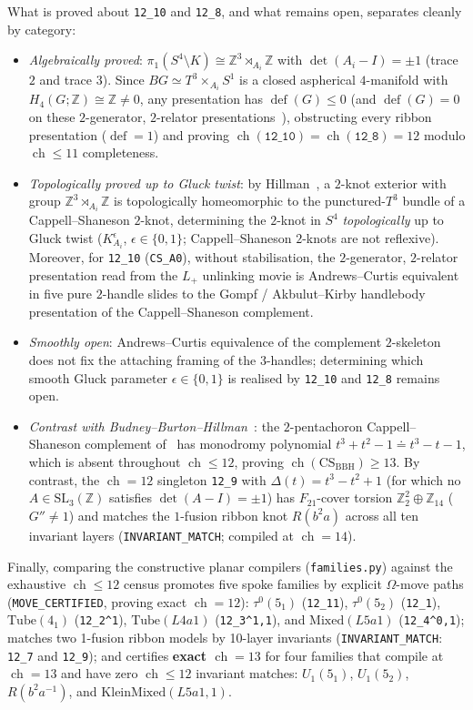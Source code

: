 \documentclass[11pt]{amsart}
\newcommand{\ch}{\operatorname{ch}}
\newcommand{\Z}{\mathbb{Z}}
\newcommand{\lab}[1]{\texttt{#1}}
\newcommand{\file}[1]{\texttt{#1}}
\newcommand{\inv}{^{-1}}
\theoremstyle{plain}
\theoremstyle{remark}
\begin{document}
What is proved about \lab{12\_10} and \lab{12\_8}, and what remains open, separates cleanly by category:
\begin{itemize}[leftmargin=*]
\item \emph{Algebraically proved}: $\pi_1(S^4\setminus K)\cong\Z^3\rtimes_{A_i}\Z$ with $\det(A_i-I)=\pm 1$
(trace $2$ and trace $3$). Since $BG\simeq T^3\times_{A_i}S^1$ is a closed aspherical $4$-manifold with
$H_4(G;\Z)\cong\Z\ne 0$, any presentation has $\operatorname{def}(G)\le 0$ (and $\operatorname{def}(G)=0$ on
these $2$-generator, $2$-relator presentations~\cite[Thm.~16.11]{Hil}), obstructing every ribbon
presentation ($\operatorname{def}=1$) and proving $\ch(\lab{12\_10})=\ch(\lab{12\_8})=12$ modulo $\ch\le 11$
completeness.
\item \emph{Topologically proved up to Gluck twist}: by Hillman~\cite[Ch.~6 \& \S 17.7]{Hil}, a $2$-knot
exterior with group $\Z^3\rtimes_{A_i}\Z$ is topologically homeomorphic to the punctured-$T^3$ bundle of a
Cappell--Shaneson $2$-knot, determining the $2$-knot in $S^4$ \emph{topologically} up to Gluck twist
($K_{A_i}^\epsilon$, $\epsilon\in\{0,1\}$; Cappell--Shaneson $2$-knots are not reflexive). Moreover, for
\lab{12\_10} (\lab{CS\_A0}), without stabilisation, the $2$-generator, $2$-relator presentation read from the
$L_+$ unlinking movie is Andrews--Curtis equivalent in five pure $2$-handle slides to the Gompf /
Akbulut--Kirby handlebody presentation of the Cappell--Shaneson complement.
\item \emph{Smoothly open}: Andrews--Curtis equivalence of the complement $2$-skeleton does not fix the
attaching framing of the $3$-handles; determining which smooth Gluck parameter $\epsilon\in\{0,1\}$ is
realised by \lab{12\_10} and \lab{12\_8} remains open.
\item \emph{Contrast with Budney--Burton--Hillman~\cite{BBH}}: the $2$-pentachoron Cappell--Shaneson
complement of~\cite{BBH} has monodromy polynomial $t^3+t^2-1\doteq t^3-t-1$, which is absent throughout
$\ch\le 12$, proving $\ch(\mathrm{CS}_{\mathrm{BBH}})\ge 13$. By contrast, the $\ch=12$ singleton \lab{12\_9}
with $\Delta(t)=t^3-t^2+1$ (for which no $A\in\mathrm{SL}_3(\Z)$ satisfies $\det(A-I)=\pm 1$) has
$F_{21}$-cover torsion $\Z_2^2\oplus\Z_{14}$ ($G''\ne 1$) and matches the $1$-fusion ribbon knot $R(b^2a)$
 across all ten invariant layers (\lab{INVARIANT\_MATCH}; compiled at $\ch=14$).
\end{itemize}

Finally, comparing the constructive planar compilers (\file{families.py}) against the exhaustive $\ch\le 12$
census promotes five spoke families by explicit $\Omega$-move paths (\lab{MOVE\_CERTIFIED}, proving exact
$\ch=12$): $\tau^0(5_1)$ (\lab{12\_11}), $\tau^0(5_2)$ (\lab{12\_1}), $\mathrm{Tube}(4_1)$ (\lab{12\_2\^{}1}),
$\mathrm{Tube}(L4a1)$ (\lab{12\_3\^{}1,1}), and $\mathrm{Mixed}(L5a1)$ (\lab{12\_4\^{}0,1}); matches two
1-fusion ribbon models by 10-layer invariants (\lab{INVARIANT\_MATCH}: \lab{12\_7} and \lab{12\_9}); and
certifies \textbf{exact $\ch=13$} for four families that compile at $\ch=13$ and have zero $\ch\le 12$
invariant matches: $U_1(5_1)$, $U_1(5_2)$, $R(b^2a\inv)$, and $\mathrm{KleinMixed}(L5a1,1)$.
\end{document}
